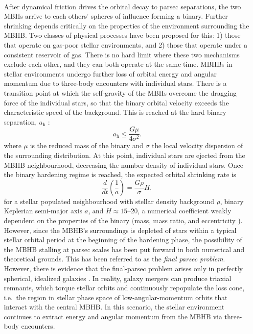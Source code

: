 \documentclass[a4paper,12pt]{article}
\begin{document}
\paragraph{}
After dynamical friction drives the orbital decay to parsec separations, the two MBHs arrive to each others' spheres of influence forming a binary. Further shrinking depends critically on the properties of the environment surrounding the MBHB. Two classes of physical processes have been proposed for this: 1) those that operate on gas-poor stellar environments, and 2) those that operate under a consistent reservoir of gas. There is no hard limit where these two mechanisms exclude each other, and they can both operate at the same time\cite{kelley2017massive,bortolas2021competing}. MBHBs in stellar environments undergo further loss of orbital energy and angular momentum due to three-body encounters with individual stars. There is a transition point at which the self-gravity of the MBHs overcome the dragging force of the individual stars, so that the binary orbital velocity exceeds the characteristic speed of the background. This is reached at the hard binary separation, $a_{\mathrm{h}}$ \cite{merritt2004massive}: 
\begin{equation}
a_{\mathrm{h}} \leq \frac{G\mu}{4\sigma^{2}}.
\label{eq:hardbinarysep}
\end{equation}
where $\mu$ is the reduced mass of the binary and $\sigma$ the local velocity dispersion of the surrounding distribution. At this point, individual stars are ejected from the MBHB neighbourhood, decreasing the number density of individual stars. Once the binary hardening regime is reached, the expected orbital shrinking rate is
\begin{equation}
\frac{d}{dt} \left(\frac{1}{a} \right)=\frac{G\rho}{\sigma} H,
\label{eq:shrinkrate}
\end{equation}
for a stellar populated neighbourhood with stellar density background $\rho$, binary Keplerian semi-major axis $a$, and $H\approx15$--$20$, a numerical coefficient weakly dependent on the properties of the binary (mass, mass ratio, and eccentricity \cite{mikkola1992evolution,quinlan1996dynamical}). However, since the MBHB's surroundings is depleted of stars within a typical stellar orbital period at the beginning of the hardening phase, the possibility of the MBHB stalling at parsec scales has been put forward in both numerical \cite{makino2004evolution,berczik2005long} and theoretical \cite{begelman1980massive} grounds. This has been referred to as the \textit{final parsec problem}. However, there is evidence that the final-parsec problem arises only in perfectly spherical, idealized galaxies \cite{gualandris2017collisionless}. In reality, galaxy mergers can produce triaxial remnants, which torque stellar orbits and continuously repopulate the loss cone\cite{frank1976effects}, i.e.\ the region in stellar phase space of low-angular-momentum orbits that interact with the central MBHB. In this scenario, the stellar environment continues to extract energy and angular momentum from the MBHB via three-body encounters.
		
\end{document}
